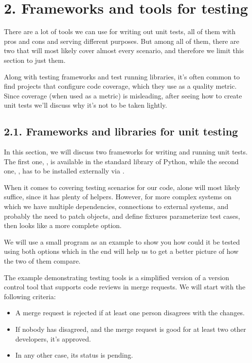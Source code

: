 \documentclass[a4paper,10pt,english]{sphinxmanual}
\begin{document}
\section{2. Frameworks and tools for testing}
\label{\detokenize{chapters/8_unit_testing/index:frameworks-and-tools-for-testing}}
There are a lot of tools we can use for writing out unit tests, all of them with pros and cons
and serving different purposes. But among all of them, there are two that will most likely
cover almost every scenario, and therefore we limit this section to just them.

Along with testing frameworks and test running libraries, it’s often common to find projects
that configure code coverage, which they use as a quality metric. Since coverage (when
used as a metric) is misleading, after seeing how to create unit tests we’ll discuss why it’s
not to be taken lightly.


\subsection{2.1. Frameworks and libraries for unit testing}
\label{\detokenize{chapters/8_unit_testing/index:frameworks-and-libraries-for-unit-testing}}
In this section, we will discuss two frameworks for writing and running unit tests. The first
one, , is available in the standard library of Python, while the second
one, , has to be installed externally via .

When it comes to covering testing scenarios for our code,  alone will most likely
suffice, since it has plenty of helpers. However, for more complex systems on which we
have multiple dependencies, connections to external systems, and probably the need to
patch objects, and define fixtures parameterize test cases, then  looks like a more
complete option.

We will use a small program as an example to show you how could it be tested using both
options which in the end will help us to get a better picture of how the two of them
compare.

The example demonstrating testing tools is a simplified version of a version control tool
that supports code reviews in merge requests. We will start with the following criteria:
\begin{itemize}
\item {} 
A merge request is rejected if at least one person disagrees with the changes.

\item {} 
If nobody has disagreed, and the merge request is good for at least two other developers, it’s approved.

\item {} 
In any other case, its status is pending.

\end{itemize}
\end{document}
